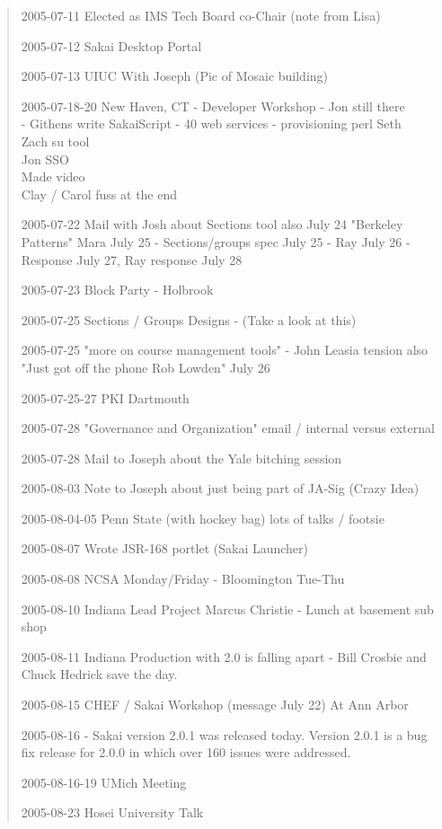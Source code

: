 \begin{quote}
2005-07-11 Elected as IMS Tech Board co-Chair (note from Lisa)

2005-07-12 Sakai Desktop Portal

2005-07-13 UIUC With Joseph (Pic of Mosaic building)

2005-07-18-20 New Haven, CT - Developer Workshop - Jon still there\\
- Githens write SakaiScript - 40 web services - provisioning perl Seth\\
Zach su tool\\
Jon SSO\\
Made video\\
Clay / Carol fuss at the end

2005-07-22 Mail with Josh about Sections tool also July 24 "Berkeley Patterns"  Mara July 25 - Sections/groups spec July 25 - Ray July 26 - Response July 27, Ray response July 28

2005-07-23 Block Party - Holbrook

2005-07-25 Sections  / Groups Designs - (Take a look at this)

2005-07-25 "more on course management tools" - John Leasia tension also "Just got off the phone Rob Lowden" July 26

2005-07-25-27 PKI Dartmouth

2005-07-28 "Governance and Organization" email / internal versus external

2005-07-28 Mail to Joseph about the Yale bitching session

2005-08-03 Note to Joseph about just being part of JA-Sig (Crazy Idea)

2005-08-04-05 Penn State (with hockey bag) lots of talks / footsie

2005-08-07 Wrote JSR-168 portlet (Sakai Launcher)

2005-08-08 NCSA Monday/Friday - Bloomington Tue-Thu

2005-08-10 Indiana Lead Project Marcus Christie - Lunch at basement sub shop

2005-08-11 Indiana Production with 2.0 is falling apart - 
Bill Crosbie and Chuck Hedrick save the day.

2005-08-15 CHEF / Sakai Workshop (message July 22) At Ann Arbor

2005-08-16 -  Sakai version 2.0.1 was released today.  
Version 2.0.1 is a bug fix release for 2.0.0 in which over 160 issues were addressed.  

2005-08-16-19 UMich Meeting

2005-08-23 Hosei University Talk


\end{quote}
